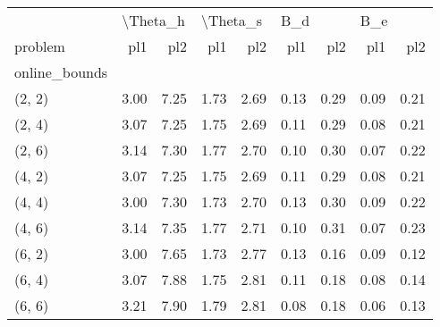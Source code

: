 \begin{tabular}{lrrrrrrrr}
\toprule
{} & \multicolumn{2}{l}{\textbackslash Theta\_h} & \multicolumn{2}{l}{\textbackslash Theta\_s} & \multicolumn{2}{l}{B\_d} & \multicolumn{2}{l}{B\_e} \\
problem &      pl1 &  pl2 &      pl1 &  pl2 &  pl1 &  pl2 &  pl1 &  pl2 \\
online\_bounds &          &      &          &      &      &      &      &      \\
\midrule
(2, 2)        &     3.00 & 7.25 &     1.73 & 2.69 & 0.13 & 0.29 & 0.09 & 0.21 \\
(2, 4)        &     3.07 & 7.25 &     1.75 & 2.69 & 0.11 & 0.29 & 0.08 & 0.21 \\
(2, 6)        &     3.14 & 7.30 &     1.77 & 2.70 & 0.10 & 0.30 & 0.07 & 0.22 \\
(4, 2)        &     3.07 & 7.25 &     1.75 & 2.69 & 0.11 & 0.29 & 0.08 & 0.21 \\
(4, 4)        &     3.00 & 7.30 &     1.73 & 2.70 & 0.13 & 0.30 & 0.09 & 0.22 \\
(4, 6)        &     3.14 & 7.35 &     1.77 & 2.71 & 0.10 & 0.31 & 0.07 & 0.23 \\
(6, 2)        &     3.00 & 7.65 &     1.73 & 2.77 & 0.13 & 0.16 & 0.09 & 0.12 \\
(6, 4)        &     3.07 & 7.88 &     1.75 & 2.81 & 0.11 & 0.18 & 0.08 & 0.14 \\
(6, 6)        &     3.21 & 7.90 &     1.79 & 2.81 & 0.08 & 0.18 & 0.06 & 0.13 \\
\bottomrule
\end{tabular}
